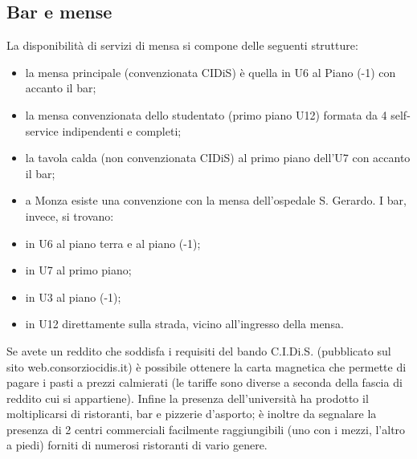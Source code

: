 \subsection{Bar e mense}
La disponibilità di servizi di mensa si compone delle seguenti strutture:
\begin{itemize}
\item la mensa principale (convenzionata CIDiS) è quella in U6 al Piano (-1) con accanto il bar; 
\item la mensa convenzionata dello studentato (primo piano U12) formata da 4 self-service indipendenti e completi; 
\item la tavola calda (non convenzionata CIDiS) al primo piano dell'U7 con accanto il bar; 
\item a Monza esiste una convenzione con la mensa dell'ospedale S. Gerardo. 
I bar, invece, si trovano: 
\item in U6 al piano terra  e al piano (-1); 
\item in U7 al primo piano; 
\item in U3 al piano (-1); 
\item in U12 direttamente sulla strada, vicino all'ingresso della mensa. 
\end{itemize}
Se avete un reddito che soddisfa i requisiti del bando C.I.Di.S. (pubblicato sul sito web.consorziocidis.it) è possibile ottenere la carta magnetica che permette di pagare i pasti a prezzi calmierati (le tariffe sono diverse a seconda della fascia di reddito cui si appartiene). 
Infine la presenza dell'università ha prodotto il moltiplicarsi di ristoranti, bar e pizzerie d'asporto; è inoltre da segnalare la presenza di 2 centri commerciali facilmente raggiungibili (uno con i mezzi, l'altro a piedi) forniti di numerosi ristoranti di vario genere. 
